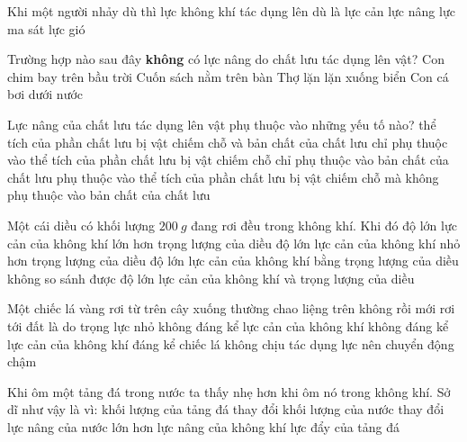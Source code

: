 \begin{ex}%
Khi một người nhảy dù thì lực không khí tác dụng lên dù là 
\choice
{\True lực cản}
{lực nâng}
{lực ma sát}
{lực gió}
 \end{ex}
\begin{ex}%
Trường hợp nào sau đây \textbf{không} có lực nâng do chất lưu tác dụng lên vật?
\choice
{Con chim bay trên bầu trời}
{\True Cuốn sách nằm trên bàn}
{Thợ lặn lặn xuống biển}
{Con cá bơi dưới nước}
 \end{ex}
\begin{ex}%
Lực nâng của chất lưu tác dụng lên vật phụ thuộc vào những yếu tố nào?
\choice
{\True thể tích của phần chất lưu bị vật chiếm chỗ và bản chất của chất lưu}
{chỉ phụ thuộc vào thể tích của phần chất lưu bị vật chiếm chỗ}
{chỉ phụ thuộc vào bản chất của chất lưu}
{phụ thuộc vào thể tích của phần chất lưu bị vật chiếm chỗ mà không phụ thuộc vào bản chất của chất lưu}
 \end{ex}
\begin{ex}%
Một cái diều có khối lượng $200\ g$ đang rơi đều trong không khí. Khi đó
\choice
{độ lớn lực cản của không khí lớn hơn trọng lượng của diều}
{độ lớn lực cản của không khí nhỏ hơn trọng lượng của diều}
{\True độ lớn lực cản của không khí bằng trọng lượng của diều}
{không so sánh được độ lớn lực cản của không khí và trọng lượng của diều}
 \end{ex}
\begin{ex}%
Một chiếc lá vàng rơi từ trên cây xuống thường chao liệng trên không rồi mới rơi tới đất là do
\choice
{trọng lực nhỏ không đáng kể}
{lực cản của không khí không đáng kể}
{\True lực cản của không khí đáng kể}
{chiếc lá không chịu tác dụng lực nên chuyển động chậm}
\loigiai{}
 \end{ex}
\begin{ex}%
Khi ôm một tảng đá trong nước ta thấy nhẹ hơn khi ôm nó trong không khí. Sở dĩ như vậy là vì:
\choice
{khối lượng của tảng đá thay đổi}
{khối lượng của nước thay đổi}
{\True lực nâng của nước lớn hơn lực nâng của không khí}
{lực đẩy của tảng đá}
\loigiai{}
 \end{ex}
